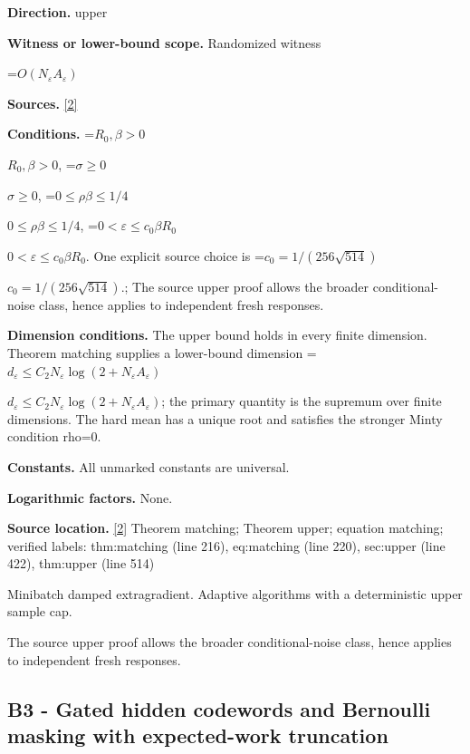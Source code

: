 \documentclass[10pt,a4paper]{article}
\newcommand{\AtlasMath}[1]{\par\begingroup\centering\setbox0=\hbox{$\displaystyle #1$}\ifdim\wd0>1.4\linewidth\typeout{ATLAS WIDE FORMULA: \the\wd0}\fi\ifdim\wd0>\linewidth\resizebox{\linewidth}{!}{\box0}\else\box0\fi\par\endgroup}
\newcommand{\AtlasInlineMath}[1]{\begingroup\setbox0=\hbox{$#1$}\ifdim\wd0>.4\linewidth\endgroup\AtlasMath{#1}\else\endgroup$#1$\fi}
\begin{document}
\textbf{Direction.} upper



\textbf{Witness or lower-bound scope.} Randomized witness



\AtlasMath{O(N_\varepsilon A_\varepsilon)}


\textbf{Sources.} \href{https://github.com/WU-Wendao/Colombo/blob/main/colombo_sensorium/Complexity_altas/data/sources/colombo/N03/manuscript.pdf}{[2]}



\textbf{Conditions.} \AtlasInlineMath{R_0,\beta>0}, \AtlasInlineMath{\sigma\ge0}, \AtlasInlineMath{0\le\rho\beta\le1/4}, \AtlasInlineMath{0<\varepsilon\le c_0\beta R_0}. One explicit source choice is \AtlasInlineMath{c_0=1/(256\sqrt{514})}.; The source upper proof allows the broader conditional-noise class, hence applies to independent fresh responses.



\textbf{Dimension conditions.} The upper bound holds in every finite dimension. Theorem matching supplies a lower-bound dimension \AtlasInlineMath{d_\varepsilon\le C_2N_\varepsilon\log(2+N_\varepsilon A_\varepsilon)}; the primary quantity is the supremum over finite dimensions. The hard mean has a unique root and satisfies the stronger Minty condition rho=0.



\textbf{Constants.} All unmarked constants are universal.



\textbf{Logarithmic factors.} None.



\textbf{Source location.} \href{https://github.com/WU-Wendao/Colombo/blob/main/colombo_sensorium/Complexity_altas/data/sources/colombo/N03/manuscript.pdf}{[2]} Theorem matching; Theorem upper; equation matching; verified labels: thm:matching (line 216), eq:matching (line 220), sec:upper (line 422), thm:upper (line 514)



Minibatch damped extragradient. Adaptive algorithms with a deterministic upper sample cap.



The source upper proof allows the broader conditional-noise class, hence applies to independent fresh responses.



\subsection{B3 - Gated hidden codewords and Bernoulli masking with expected-work truncation}
\end{document}

